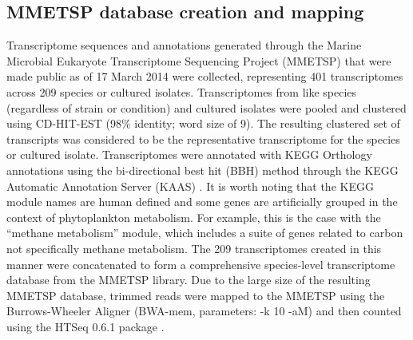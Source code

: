 \subsection{MMETSP database creation and mapping}
Transcriptome sequences and annotations generated through the Marine Microbial Eukaryote Transcriptome Sequencing Project (MMETSP) that were made public as of 17 March 2014 were collected, representing 401 transcriptomes across 209 species or cultured isolates. Transcriptomes from like species (regardless of strain or condition) and cultured isolates were pooled and clustered using CD-HIT-EST (98\% identity; word size of 9). The resulting clustered set of transcripts was considered to be the representative transcriptome for the species or cultured isolate. Transcriptomes were annotated with KEGG Orthology annotations using the bi-directional best hit (BBH) method through the KEGG Automatic Annotation Server (KAAS) \citep{Moriya2007}. It is worth noting that the KEGG module names are human defined and some genes are artificially grouped in the context of phytoplankton metabolism.  For example, this is the case with the “methane metabolism” module, which includes a suite of genes related to carbon not specifically methane metabolism. The 209 transcriptomes created in this manner were concatenated to form a comprehensive species-level transcriptome database from the MMETSP library. Due to the large size of the resulting MMETSP database, trimmed reads were mapped to the MMETSP using the Burrows-Wheeler Aligner \citep{Li2010} (BWA-mem, parameters: -k 10 -aM) and then counted using the HTSeq 0.6.1 package \citep{Anders2014}. \par
